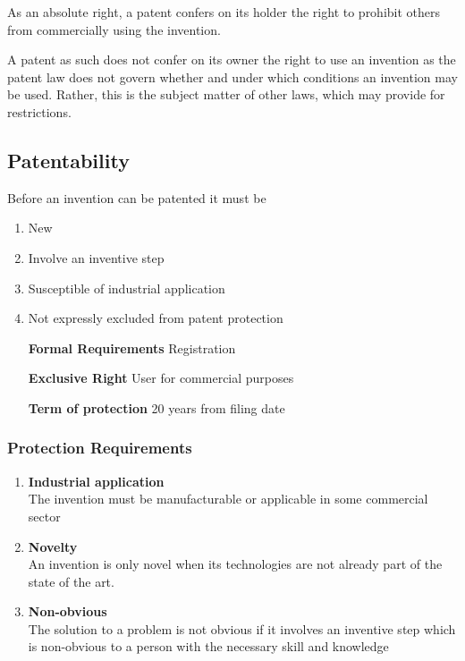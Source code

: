 \documentclass[11pt]{article}
\theoremstyle{definition}
\begin{document}
As an absolute right, a patent confers on its holder the right to prohibit others from commercially using the invention.

A patent as such does not confer on its owner the right to use an invention as the patent law does not govern whether and under which conditions an invention may be used. Rather, this is the subject matter of other laws, which may provide for restrictions.

\subsection{Patentability}
Before an invention can be patented it must be
\begin{enumerate}
	\item New
	\item Involve an inventive step
	\item Susceptible of industrial application
	\item Not expressly excluded from patent protection
\end{enumerate}

\begin{itemize}[leftmargin=*, labelindent=4cm, labelsep=1cm]
	\item[\textbf{Formal Requirements}] Registration
	\item[\textbf{Exclusive Right}] User for commercial purposes
	\item[\textbf{Term of protection}] 20 years from filing date
\end{itemize}

\subsubsection{Protection Requirements}
\begin{enumerate}
	\item \textbf{Industrial application}\\
	The invention must be manufacturable or applicable in some commercial sector
	\item \textbf{Novelty}\\
	An invention is only novel when its technologies are not already part of the state of the art.
	\item \textbf{Non-obvious}\\
	The solution to a problem is not obvious if it involves an inventive step which is non-obvious to a person with the necessary skill and knowledge
\end{enumerate}
\end{document}
